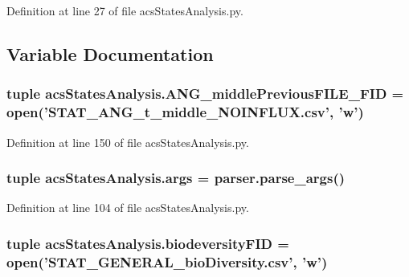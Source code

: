 Definition at line 27 of file acs\-States\-Analysis.\-py.



\subsection{Variable Documentation}
\hypertarget{a00130_aa5eb16eef2c90e2ccc991eb176280f21}{
\subsubsection[{A\-N\-G\-\_\-middle\-Previous\-F\-I\-L\-E\-\_\-\-F\-I\-D}]{\setlength{\rightskip}{0pt plus 5cm}tuple acs\-States\-Analysis.\-A\-N\-G\-\_\-middle\-Previous\-F\-I\-L\-E\-\_\-\-F\-I\-D = open('S\-T\-A\-T\-\_\-\-A\-N\-G\-\_\-t\-\_\-middle\-\_\-\-N\-O\-I\-N\-F\-L\-U\-X.\-csv', 'w')}}\label{a00130_aa5eb16eef2c90e2ccc991eb176280f21}


Definition at line 150 of file acs\-States\-Analysis.\-py.

\hypertarget{a00130_a4912a255d0be60fffea119e6bd92b6e4}{
\subsubsection[{args}]{\setlength{\rightskip}{0pt plus 5cm}tuple acs\-States\-Analysis.\-args = parser.\-parse\-\_\-args()}}\label{a00130_a4912a255d0be60fffea119e6bd92b6e4}


Definition at line 104 of file acs\-States\-Analysis.\-py.

\hypertarget{a00130_a68c23cb79e89d9e14acf9ed09f46f0e4}{
\subsubsection[{biodeversity\-F\-I\-D}]{\setlength{\rightskip}{0pt plus 5cm}tuple acs\-States\-Analysis.\-biodeversity\-F\-I\-D = open('S\-T\-A\-T\-\_\-\-G\-E\-N\-E\-R\-A\-L\-\_\-bio\-Diversity.\-csv', 'w')}}\label{a00130_a68c23cb79e89d9e14acf9ed09f46f0e4}


